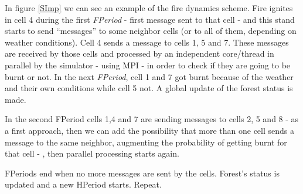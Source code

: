 \documentclass[11pt]{article}
\begin{document}
In figure \ref{SImp} we can see an example of the fire dynamics scheme. Fire ignites in cell 4 during the first \textit{FPeriod } - first message sent to that cell - and this stand starts to send ``messages'' to some neighbor cells (or to all of them, depending on weather conditions). Cell 4 sends a message to cells 1, 5 and 7. These messages are received by those cells and processed by an independent core/thread in parallel by the simulator - using MPI - in order to check if they are going to be burnt or not. In the next \textit{FPeriod}, cell 1 and 7 got burnt because of the weather and their own conditions while cell 5 not. A global update of the forest status is made.\

In the second FPeriod cells 1,4 and 7 are sending messages to cells 2, 5 and 8 - as a first approach, then we can add the possibility that more than one cell sends a message to the same neighbor, augmenting the probability of getting burnt for that cell - , then parallel processing starts again.\

FPeriods end when no more messages are sent by the cells. Forest's status is updated and a new HPeriod starts. Repeat. 
\end{document}

